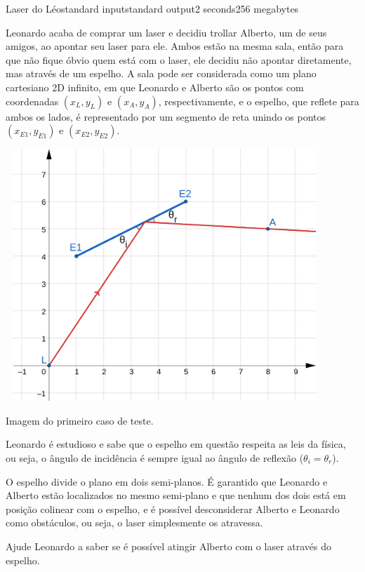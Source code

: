 \begin{problem}{Laser do Léo}{standard input}{standard output}{2 seconds}{256 megabytes}

Leonardo acaba de comprar um laser e decidiu trollar Alberto, um de seus amigos, ao apontar seu laser para ele. Ambos estão na mesma sala, então para que não fique óbvio quem está com o laser, ele decidiu não apontar diretamente, mas através de um espelho. A sala pode ser considerada como um plano cartesiano 2D infinito, em que Leonardo e Alberto são os pontos com coordenadas $(x_L, y_L)$ e $(x_A, y_A)$, respectivamente, e o espelho, que reflete para ambos os lados, é representado por um segmento de reta unindo os pontos $(x_{E1}, y_{E1})$ e $(x_{E2}, y_{E2})$.

\begin{center}
\includegraphics[width=12.0cm, height=9.5cm]{Teste1.png}

Imagem do primeiro caso de teste.
\end{center}

Leonardo é estudioso e sabe que o espelho em questão respeita as leis da física, ou seja, o ângulo de incidência é sempre igual ao ângulo de reflexão ($\theta_i = \theta_r$).

O espelho divide o plano em dois semi-planos. É garantido que Leonardo e Alberto estão localizados no mesmo semi-plano e que nenhum dos dois está em posição colinear com o espelho, e é possível desconsiderar Alberto e Leonardo como obstáculos, ou seja, o laser simplesmente os atravessa.

Ajude Leonardo a saber se é possível atingir Alberto com o laser através do espelho.


\end{problem}
